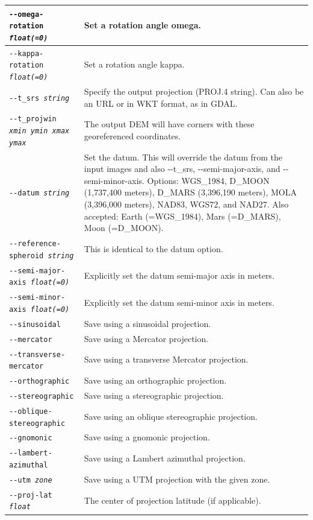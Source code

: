 \begin{longtable}{|p{8cm}|p{9cm}|}
\texttt{-\/-omega-rotation \textit{float(=0)}} & Set a rotation angle omega. \\ \hline
\texttt{-\/-kappa-rotation \textit{float(=0)}} & Set a rotation angle kappa. \\ \hline
\hline
\texttt{-\/-t\_srs \textit{string}} & Specify the output projection (PROJ.4 string).  Can also be an URL or in WKT format, as in GDAL.\\ \hline
\texttt{-\/-t\_projwin \textit{xmin ymin xmax ymax} } & The output DEM will have corners with these georeferenced coordinates. \\ \hline
\texttt{-\/-datum \textit{string}} & Set the datum. This will override the datum from the input images and also -\/-t\_srs, -\/-semi-major-axis, and -\/-semi-minor-axis. Options: WGS\_1984, D\_MOON (1,737,400 meters), D\_MARS (3,396,190 meters), MOLA (3,396,000 meters), NAD83, WGS72, and NAD27. Also accepted: Earth (=WGS\_1984), Mars (=D\_MARS), Moon (=D\_MOON). \\ \hline
\texttt{-\/-reference-spheroid \textit{string}} & This is identical to the datum option. \\ \hline
\texttt{-\/-semi-major-axis \textit{float(=0)}} & Explicitly set the datum semi-major axis in meters.\\ \hline
\texttt{-\/-semi-minor-axis \textit{float(=0)}} & Explicitly set the datum semi-minor axis in meters.\\ \hline
\texttt{-\/-sinusoidal} & Save using a sinusoidal projection. \\ \hline
\texttt{-\/-mercator} & Save using a Mercator projection. \\ \hline
\texttt{-\/-transverse-mercator} & Save using a transverse Mercator projection. \\ \hline
\texttt{-\/-orthographic} & Save using an orthographic projection. \\ \hline
\texttt{-\/-stereographic} & Save using a stereographic projection. \\ \hline
\texttt{-\/-oblique-stereographic} & Save using an oblique stereographic projection. \\ \hline
\texttt{-\/-gnomonic} & Save using a gnomonic projection. \\ \hline
\texttt{-\/-lambert-azimuthal} & Save using a Lambert azimuthal projection. \\ \hline
\texttt{-\/-utm \textit{zone}} & Save using a UTM projection with the given zone. \\ \hline
\texttt{-\/-proj-lat \textit{float}} & The center of projection latitude (if applicable). \\ \hline

\end{longtable}
